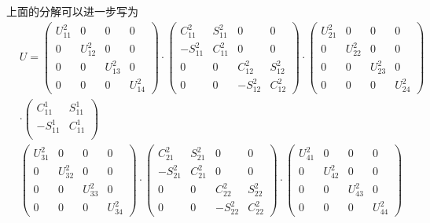 上面的分解可以进一步写为
\begin{equation}
\begin{split}
&U=\begin{pmatrix}U^2_{11} & 0 & 0 & 0\\ 0 & U^2_{12} & 0 & 0 \\ 0 & 0 & U^2_{13} & 0 \\ 0 & 0 & 0 & U^2_{14} \end{pmatrix} 
  \cdot\begin{pmatrix}C^2_{11} & S^2_{11} & 0 & 0\\ -S^2_{11} & C^2_{11} & 0 & 0 \\ 0 & 0 & C^2_{12} & S^2_{12} \\ 0 & 0 & -S^2_{12} & C^2_{12} \end{pmatrix}
  \cdot \begin{pmatrix}U^2_{21} & 0 & 0 & 0\\ 0 & U^2_{22} & 0 & 0 \\ 0 & 0 & U^2_{23} & 0 \\ 0 & 0 & 0 & U^2_{24} \end{pmatrix} \\
& \cdot \begin{pmatrix}C^1_{11} & S^1_{11} \\ -S^1_{11} & C^1_{11} \\ \end{pmatrix} \\
& \begin{pmatrix}U^2_{31} & 0 & 0 & 0\\ 0 & U^2_{32} & 0 & 0 \\ 0 & 0 & U^2_{33} & 0 \\ 0 & 0 & 0 & U^2_{34} \end{pmatrix} 
\cdot\begin{pmatrix}C^2_{21} & S^2_{21} & 0 & 0\\ -S^2_{21} & C^2_{21} & 0 & 0 \\ 0 & 0 & C^2_{22} & S^2_{22} \\ 0 & 0 & -S^2_{22} & C^2_{22} \end{pmatrix}
\cdot \begin{pmatrix}U^2_{41} & 0 & 0 & 0\\ 0 & U^2_{42} & 0 & 0 \\ 0 & 0 & U^2_{43} & 0 \\ 0 & 0 & 0 & U^2_{44} \end{pmatrix} \\
\end{split}
\end{equation}

